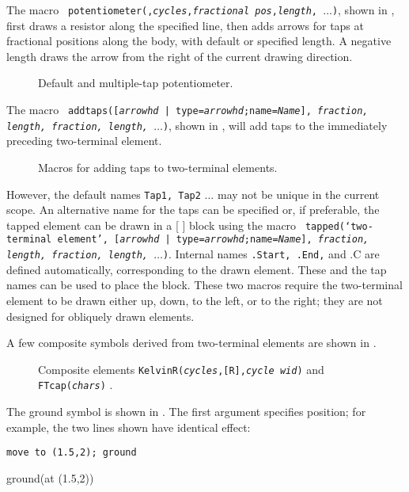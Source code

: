 The macro {\tt
   potentiometer(\linespec,{\sl cycles},{\sl fractional pos},{\sl length},
    $\ldots$)},
shown in ,
first draws a resistor along the specified line, then adds arrows for taps
at fractional positions along the body, with default or specified length.
A negative length draws the arrow from the right of the current drawing
direction.
\begin{figure}[ht!]
   
   \caption{Default and multiple-tap potentiometer.}
   \label{Potentiometers}
   \end{figure}

The macro {\tt
    addtaps([{\sl arrowhd} | type={\sl arrowhd};name={\sl Name}],
    {\sl fraction, length, fraction, length,}
    $\ldots$)},
shown in , will add taps to the
immediately preceding two-terminal element.
\begin{figure}[ht]
   
   \caption{Macros for adding taps to two-terminal elements.}
   \label{Taps}
   \end{figure}
However, the default names
{\tt Tap1, Tap2} $\ldots$ may not be unique in the current scope.  An
alternative name for the taps can be specified or, if preferable, the
tapped element can be drawn in a [ ] block using the macro {\tt
  tapped(`{\sl two-terminal element}',
  [{\sl arrowhd} | type={\sl arrowhd};name={\sl Name}],
    {\sl fraction, length, fraction, length,} $\ldots$)}.
   Internal names {\tt .Start, .End,} and {.C} are defined automatically,
   corresponding to the drawn element. These and the tap names can be used
   to place the block.
These two macros require the two-terminal element to be drawn either up,
down, to the left, or to the right; they are not designed for obliquely
drawn elements.

A few composite symbols derived from two-terminal elements
are shown in .
\begin{figure}[h!b]
   \vspace*{-0.5ex}
   
   \vspace*{-0.5ex}
   \caption{Composite elements {\tt KelvinR({\sl cycles},[R],{\sl cycle wid})}
      and {\tt FTcap({\sl chars})} .}
   \label{Composite}
   \end{figure}

\enlargethispage{\baselineskip}
The ground symbol is shown in .
The first argument specifies position; for example, the two lines shown
have identical effect:
\par
{\tt move to (1.5,2); ground
\par
ground(at (1.5,2)) }

